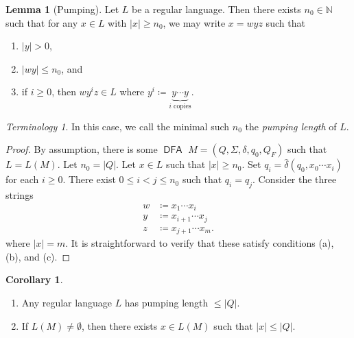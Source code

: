 \documentclass[10pt,letterpaper,cm]{nupset}
\theoremstyle{definition}
\theoremstyle{theorem}
\newtheorem{lemma}[definition]{Lemma}
\newtheorem{corollary}[definition]{Corollary}
\theoremstyle{remark}
\newtheorem*{term}{Terminology}
\newcommand{\N}{\mathbb N}
\newcommand{\1}{\mathbf{1}}
\newcommand{\0}{\vec 0}
\DeclareMathOperator{\DFA}{\mathsf{DFA}}
\begin{document}
\begin{lemma}[Pumping] Let $L$ be a regular language. Then there exists $n_0 \in \N$ such that for any $x\in L$ with $\left\lvert{x}\right\rvert\geq n_0$, we may write $x=wyz$ such that
\begin{enumerate}[label=(\alph*)]
\item $\left\lvert{y}\right\rvert >0$,
\item $\left\lvert{wy}\right\rvert\leq n_0$, and
\item if $i\geq 0$, then $wy^iz \in L$ where $y^i \coloneqq \underbrace{y\cdots y}_{i \text{ copies}}$.
\end{enumerate}
\end{lemma}
\begin{term}
In this case, we call the minimal such $n_0$ the \textit{pumping length} of $L$.
\end{term}
\begin{proof}
By assumption, there is some $\DFA$ $M = \left(Q, \Sigma, \delta, q_0, Q_F\right)$ such that $L = L(M)$. Let $n_0 = \left\lvert{Q}\right\rvert$. Let $x\in L$ such that $\left\lvert{x}\right\rvert\geq n_0$. Set $q_i = \hat{\delta}(q_0, x_0 \cdots x_i)$ for each $i\geq 0$.  There exist $0\leq i<j \leq n_0$ such that $q_i = q_j$. Consider the three strings 
\begin{align*}
w  &\coloneqq x_1\cdots x_i 
\\  y &\coloneqq  x_{i+1}\cdots x_j 
\\  z &\coloneqq x_{j+1} \cdots x_m.
\end{align*}
where $\left\lvert{x}\right\rvert = m$. It is straightforward to verify that these satisfy conditions (a), (b), and (c).
\end{proof}
\begin{corollary} $ $
\begin{enumerate} 
\item Any regular language $L$ has pumping length $\leq \left\lvert{Q}\right\rvert$.
\item If $L(M) \ne \emptyset$, then there exists $x\in L(M)$ such that $\left\lvert{x}\right\rvert \leq \left\lvert{Q}\right\rvert$.
\end{enumerate}
\end{corollary}
\end{document}
